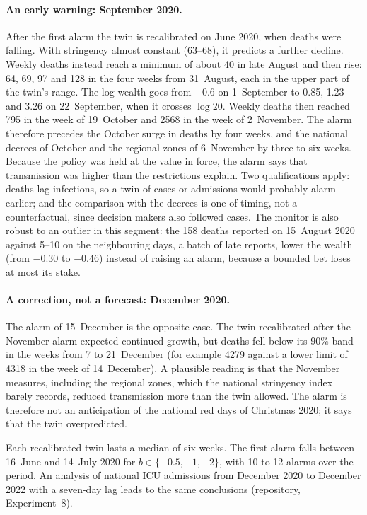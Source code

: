 \paragraph{An early warning: September 2020.} After the first alarm the twin
is recalibrated on June 2020, when deaths were falling. With stringency almost
constant (63--68), it predicts a further decline. Weekly deaths instead reach
a minimum of about 40 in late August and then rise: 64, 69, 97 and 128 in the
four weeks from 31~August, each in the upper part of the twin's range. The log
wealth goes from $-0.6$ on 1~September to 0.85, 1.23 and 3.26 on 22~September,
when it crosses $\log 20$. Weekly deaths then reached 795 in the week of
19~October and 2568 in the week of 2~November. The alarm therefore precedes
the October surge in deaths by four weeks, and the national decrees of October
and the regional zones of 6~November by three to six weeks. Because the policy
was held at the value in force, the alarm says that transmission was higher
than the restrictions explain. Two qualifications apply: deaths lag infections,
so a twin of cases or admissions would probably alarm earlier; and the
comparison with the decrees is one of timing, not a counterfactual, since
decision makers also followed cases. The monitor is also robust to an outlier
in this segment: the 158 deaths reported on 15~August 2020 against 5--10 on
the neighbouring days, a batch of late reports, lower the wealth (from $-0.30$
to $-0.46$) instead of raising an alarm, because a bounded bet loses at most
its stake.

\paragraph{A correction, not a forecast: December 2020.} The alarm of
15~December is the opposite case. The twin recalibrated after the November
alarm expected continued growth, but deaths fell below its 90\% band in the
weeks from 7 to 21~December (for example 4279 against a lower limit of 4318 in
the week of 14~December). A plausible reading is that the November measures,
including the regional zones, which the national stringency index barely
records, reduced transmission more than the twin allowed. The alarm is
therefore not an anticipation of the national red days of Christmas 2020; it
says that the twin overpredicted.

Each recalibrated twin lasts a median of six weeks. The first alarm falls
between 16~June and 14~July 2020 for $b \in \{-0.5, -1, -2\}$, with 10 to 12
alarms over the period. An analysis of national ICU admissions from December
2020 to December 2022 with a seven-day lag leads to the same conclusions
(repository, Experiment~8).

